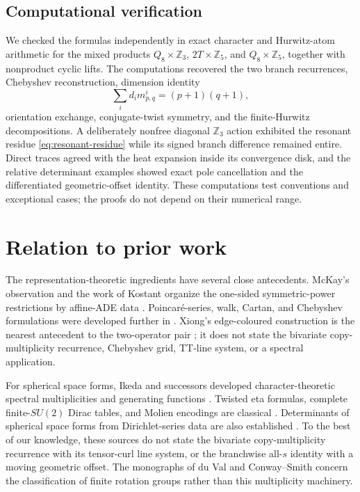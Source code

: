 \documentclass[11pt]{article}
\theoremstyle{definition}
\newcommand{\Z}{\mathbb Z}
\begin{document}
\subsection{Computational verification}

We checked the formulas independently in exact character and
Hurwitz-atom arithmetic for the mixed products
$Q_8\times\Z_3$, $2T\times\Z_5$, and $Q_8\times\Z_5$, together with
nonproduct cyclic lifts.  The computations recovered the two branch
recurrences, Chebyshev reconstruction, dimension identity
\[
 \sum_i d_i m_{p,q}^i=(p+1)(q+1),
\]
orientation exchange, conjugate-twist symmetry, and the finite-Hurwitz
decompositions.  A deliberately nonfree diagonal $\Z_3$ action exhibited
the resonant residue \eqref{eq:resonant-residue} while its signed branch
difference remained entire.  Direct traces agreed with the heat expansion
inside its convergence disk, and the relative determinant examples showed
exact pole cancellation and the differentiated geometric-offset identity.
These computations test conventions and exceptional cases; the proofs do
not depend on their numerical range.

\section{Relation to prior work}

The representation-theoretic ingredients have several close
antecedents.  McKay's observation and the work of Kostant organize the
one-sided symmetric-power restrictions by affine-ADE data
\cite{McKay1980,Kostant1985,Steinberg1985,Springer1987,
Stekolshchik2008}.  Poincar\'e-series, walk, Cartan, and
Chebyshev formulations were developed further in
\cite{Rossmann2003,Suter2007,Benkart2016,JingWangZhang2020,
JingWangZhang2021}.  Xiong's edge-coloured construction is the nearest
antecedent to the two-operator pair \cite{Xiong2020}; it does not state
the bivariate copy-multiplicity recurrence, Chebyshev grid, TT-line
system, or a spectral application.

For spherical space forms, Ikeda and successors developed
character-theoretic spectral multiplicities and generating functions
\cite{Ikeda1980I,Ikeda1980II,Ikeda1980Lens,
IkedaYamamoto1979,Bar1996,LauretMiatelloRossetti2021}.  Twisted eta
formulas, complete finite-$SU(2)$ Dirac tables, and Molien encodings are
classical \cite{APS1975,Donnelly1978,Gilkey1984,
CisnerosMolina2001,Degeratu2001,Degeratu2009}.  Determinants of
spherical space forms from Dirichlet-series data are also established
\cite{BauerFurutani2008}.  To the best of our knowledge, these sources do
not state the bivariate copy-multiplicity recurrence with its tensor-curl
line system, or the branchwise all-$s$ identity with a moving geometric
offset.  The monographs of du Val and Conway--Smith
\cite{duVal1964,ConwaySmith2003} concern the classification of finite
rotation groups rather than this multiplicity machinery.
\end{document}
